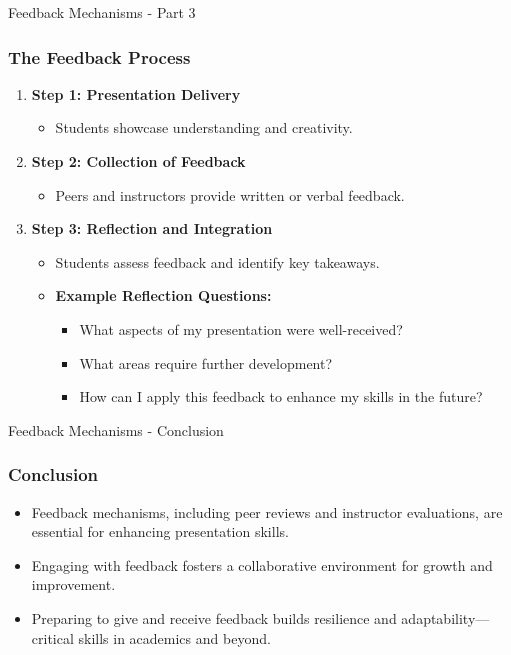 \documentclass[aspectratio=169]{beamer}
\begin{document}
\begin{frame}[fragile]{Feedback Mechanisms - Part 3}
    \frametitle{The Feedback Process}
    \begin{enumerate}
        \item \textbf{Step 1: Presentation Delivery}
            \begin{itemize}
                \item Students showcase understanding and creativity.
            \end{itemize}
        
        \item \textbf{Step 2: Collection of Feedback}
            \begin{itemize}
                \item Peers and instructors provide written or verbal feedback.
            \end{itemize}
        
        \item \textbf{Step 3: Reflection and Integration}
            \begin{itemize}
                \item Students assess feedback and identify key takeaways.
                \item \textbf{Example Reflection Questions:}
                    \begin{itemize}
                        \item What aspects of my presentation were well-received?
                        \item What areas require further development?
                        \item How can I apply this feedback to enhance my skills in the future?
                    \end{itemize}
            \end{itemize}
    \end{enumerate}
\end{frame}

\begin{frame}[fragile]{Feedback Mechanisms - Conclusion}
    \frametitle{Conclusion}
    \begin{itemize}
        \item Feedback mechanisms, including peer reviews and instructor evaluations, are essential for enhancing presentation skills.
        \item Engaging with feedback fosters a collaborative environment for growth and improvement.
        \item Preparing to give and receive feedback builds resilience and adaptability—critical skills in academics and beyond.
    \end{itemize}
\end{frame}
\end{document}

